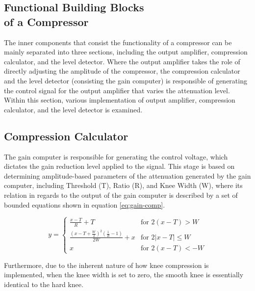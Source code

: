 \documentclass[10pt]{article}
\begin{document}
\begin{multicols*}{2}
        \section[Functional Building Blocks of a Compressor]{Functional Building Blocks\\of a Compressor}
            The inner components that consist the functionality of a compressor can be mainly separated into three sections, including the output amplifier, compression calculator, and the level detector. Where the output amplifier takes the role of directly adjusting the amplitude of the compressor, the compression calculator and the level detector (consisting the gain computer) is responsible of generating the control signal for the output amplifier that varies the attenuation level. Within this section, various implementation of output amplifier, compression calculator, and the level detector is examined.

            \subsection{Compression Calculator}
                The gain computer is responsible for generating the control voltage, which dictates the gain reduction level applied to the signal. This stage is based on determining amplitude-based parameters of the attenuation generated by the gain computer, including Threshold (T), Ratio (R), and Knee Width (W), where its relation in regards to the output of the gain computer is described by a set of bounded equations shown in equation \ref{eq:gain-comp}.

                    \begin{equation}
                        y=
                        \begin{cases}
                            \frac{x-T}{R}+T & \text{for $2(x-T)>W$}\\[5pt]
                            \frac{(x-T+\frac{W}{2})^2(\frac{1}{R}-1)}{2W}+x & \text{for $2\left\lvert x-T\right\rvert\leq W$}\\[5pt]
                            x & \text{for $2(x-T)<-W$}
                        \end{cases}
                        \label{eq:gain-comp}
                    \end{equation}

                \noindent Furthermore, due to the inherent nature of how knee compression is implemented, when the knee width is set to zero, the smooth knee is essentially identical to the hard knee.
            

\end{multicols*}
\end{document}
